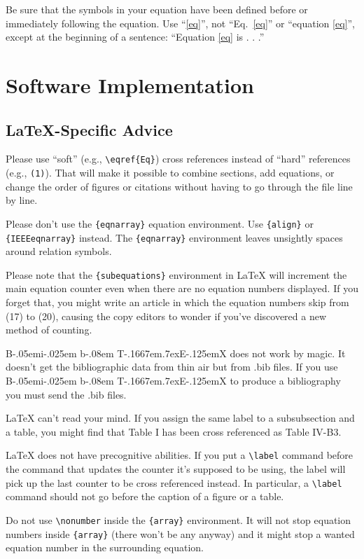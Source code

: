 \documentclass[conference]{IEEEtran}
\def\BibTeX{{\rm B\kern-.05em{\sc i\kern-.025em b}\kern-.08em
    T\kern-.1667em\lower.7ex\hbox{E}\kern-.125emX}}
\begin{document}
Be sure that the 
symbols in your equation have been defined before or immediately following 
the equation. Use ``\eqref{eq}'', not ``Eq.~\eqref{eq}'' or ``equation \eqref{eq}'', except at 
the beginning of a sentence: ``Equation \eqref{eq} is . . .''
\section{Software Implementation}

\subsection{\LaTeX-Specific Advice}

Please use ``soft'' (e.g., \verb|\eqref{Eq}|) cross references instead
of ``hard'' references (e.g., \verb|(1)|). That will make it possible
to combine sections, add equations, or change the order of figures or
citations without having to go through the file line by line.

Please don't use the \verb|{eqnarray}| equation environment. Use
\verb|{align}| or \verb|{IEEEeqnarray}| instead. The \verb|{eqnarray}|
environment leaves unsightly spaces around relation symbols.

Please note that the \verb|{subequations}| environment in {\LaTeX}
will increment the main equation counter even when there are no
equation numbers displayed. If you forget that, you might write an
article in which the equation numbers skip from (17) to (20), causing
the copy editors to wonder if you've discovered a new method of
counting.

{\BibTeX} does not work by magic. It doesn't get the bibliographic
data from thin air but from .bib files. If you use {\BibTeX} to produce a
bibliography you must send the .bib files. 

{\LaTeX} can't read your mind. If you assign the same label to a
subsubsection and a table, you might find that Table I has been cross
referenced as Table IV-B3. 

{\LaTeX} does not have precognitive abilities. If you put a
\verb|\label| command before the command that updates the counter it's
supposed to be using, the label will pick up the last counter to be
cross referenced instead. In particular, a \verb|\label| command
should not go before the caption of a figure or a table.

Do not use \verb|\nonumber| inside the \verb|{array}| environment. It
will not stop equation numbers inside \verb|{array}| (there won't be
any anyway) and it might stop a wanted equation number in the
surrounding equation.
\end{document}
